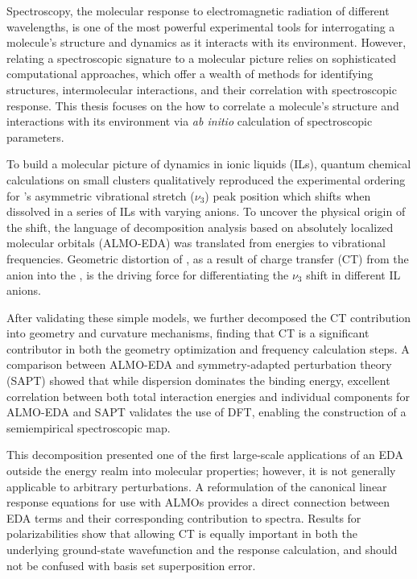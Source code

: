 \documentclass[%
  class = article,%
  crop = false,%
  float = true,%
  multi = true,%
  preview = false,%
]{standalone}
\newcommand{\arlidimer}{\ce{Ar\bond{....}Li+}}
\begin{document}
Spectroscopy, the molecular response to electromagnetic radiation of different wavelengths, is one of the most powerful experimental tools for interrogating a molecule's structure and dynamics as it interacts with its environment. However, relating a spectroscopic signature to a molecular picture relies on sophisticated computational approaches, which offer a wealth of methods for identifying structures, intermolecular interactions, and their correlation with spectroscopic response. This thesis focuses on the how to correlate a molecule's structure and interactions with its environment via \textit{ab initio} calculation of spectroscopic parameters.

To build a molecular picture of  dynamics in ionic liquids (ILs), quantum chemical calculations on small clusters qualitatively reproduced the experimental ordering for 's asymmetric vibrational stretch (\(\nu_3\)) peak position which shifts when dissolved in a series of ILs with varying anions. To uncover the physical origin of the shift, the language of decomposition analysis based on absolutely localized molecular orbitals (ALMO-EDA) was translated from energies to vibrational frequencies. Geometric distortion of , as a result of charge transfer (CT) from the anion into the , is the driving force for differentiating the  \(\nu_3\) shift in different IL anions.

After validating these simple models, we further decomposed the CT contribution into geometry and curvature mechanisms, finding that CT is a significant contributor in both the geometry optimization and frequency calculation steps. A comparison between ALMO-EDA and symmetry-adapted perturbation theory (SAPT) showed that while dispersion dominates the binding energy, excellent correlation between both total interaction energies and individual components for ALMO-EDA and SAPT validates the use of DFT, enabling the construction of a semiempirical spectroscopic map.

This decomposition presented one of the first large-scale applications of an EDA outside the energy realm into molecular properties; however, it is not generally applicable to arbitrary perturbations. A reformulation of the canonical linear response equations for use with ALMOs provides a direct connection between EDA terms and their corresponding contribution to spectra. Results for \arlidimer{} polarizabilities show that allowing CT is equally important in both the underlying ground-state wavefunction and the response calculation, and should not be confused with basis set superposition error.
\end{document}
